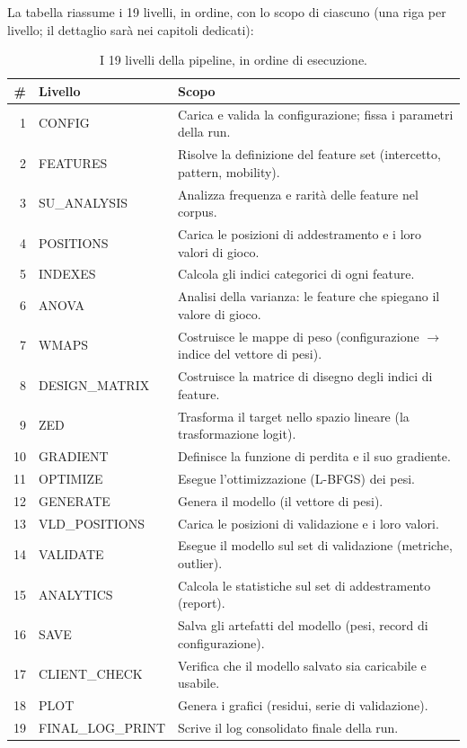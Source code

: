 La tabella riassume i 19 livelli, in ordine, con lo scopo di ciascuno (una riga
per livello; il dettaglio sarà nei capitoli dedicati):

\begin{table}[htbp]
\centering
\small
\begin{tabular}{rll}
\toprule
\# & Livello & Scopo \\
\midrule
1  & CONFIG          & Carica e valida la configurazione; fissa i parametri della run. \\
2  & FEATURES        & Risolve la definizione del feature set (intercetto, pattern, mobility). \\
3  & SU\_ANALYSIS    & Analizza frequenza e rarità delle feature nel corpus. \\
4  & POSITIONS       & Carica le posizioni di addestramento e i loro valori di gioco. \\
5  & INDEXES         & Calcola gli indici categorici di ogni feature. \\
6  & ANOVA           & Analisi della varianza: le feature che spiegano il valore di gioco. \\
7  & WMAPS           & Costruisce le mappe di peso (configurazione $\to$ indice del vettore di pesi). \\
8  & DESIGN\_MATRIX  & Costruisce la matrice di disegno degli indici di feature. \\
9  & ZED             & Trasforma il target nello spazio lineare (la trasformazione logit). \\
10 & GRADIENT        & Definisce la funzione di perdita e il suo gradiente. \\
11 & OPTIMIZE        & Esegue l'ottimizzazione (L-BFGS) dei pesi. \\
12 & GENERATE        & Genera il modello (il vettore di pesi). \\
13 & VLD\_POSITIONS  & Carica le posizioni di validazione e i loro valori. \\
14 & VALIDATE        & Esegue il modello sul set di validazione (metriche, outlier). \\
15 & ANALYTICS       & Calcola le statistiche sul set di addestramento (report). \\
16 & SAVE            & Salva gli artefatti del modello (pesi, record di configurazione). \\
17 & CLIENT\_CHECK   & Verifica che il modello salvato sia caricabile e usabile. \\
18 & PLOT            & Genera i grafici (residui, serie di validazione). \\
19 & FINAL\_LOG\_PRINT & Scrive il log consolidato finale della run. \\
\bottomrule
\end{tabular}
\caption{I 19 livelli della pipeline, in ordine di esecuzione.}
\label{tab:pipeline-levels}
\end{table}

